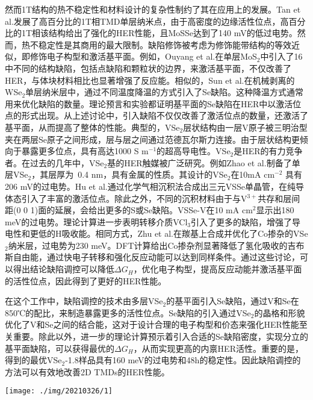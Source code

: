 \documentclass[reprint, aps, prb, showkeys]{revtex4-2}
\begin{document}
然而1T结构的热不稳定性和材料设计的复杂性制约了其在应用上的发展。Tan et al.发展了高百分比的1T相TMD单层纳米点，由于高密度的边缘活性位点，高百分比的1T相该结构给出了强化的HER性能，且MoSSe达到了140 mV的低过电势。然而，热不稳定性是其商用的最大限制。缺陷修饰被考虑为修饰能带结构的等效近似，即修饰电子构型和激活基平面。例如，Ouyang et al.在单层MoS$_2$中引入了16中不同的结构缺陷，包括点缺陷和颗粒状的边界，来激活基平面，不仅改善了HER，与体块材料相比也显著增强了反应能。相似的，Sun et al.在机械剥离的WSe$_2$单层纳米层中，通过不同温度降温的方式引入了Se缺陷。这种降温方式通常用来优化缺陷的数量。理论预言和实验都证明基平面的Se缺陷在HER中以激活位点的形式出现。从上述讨论中，引入缺陷不仅仅改善了激活位点的数量，还激活了基平面，从而提高了整体的性能。典型的，VSe$_2$层状结构由一层V原子被三明治型夹在两层Se原子之间形成，层与层之间通过范德瓦尔斯力连接。由于层状结构更倾向于暴露更多位点，具有高达1000 S m$^{-1}$的超高导电性。VSe$_2$是HER的有力竞争者。在过去的几年中，VSe$_2$基的HER触媒被广泛研究。例如Zhao et al.制备了单层VSe$_2$，其层厚为~0.4 nm，具有金属的性质。其设计的VSe$_2$在10mA cm$^{-2}$ 具有206 mV的过电势。Hu et al.通过化学气相沉积法合成出三元VSSe单晶管，在纯导体态引入了丰富的激活位点。除此之外，不同的沉积材料由于与V$^{3+}$共存和层间距(0 0 1)面的延展，会给出更多的S或Se缺陷。VSSe-V在10 mA cm$^2$显示出180 meV的过电势。理论计算进一步表明转移介质VCl$_3$引入了更多的缺陷，增强了导电性和更低的H吸收能。相同方式，Zhu et al.在羰基上合成并优化了Co掺杂的VSe$_2$纳米层，过电势为230 meV。DFT计算给出Co掺杂剂显著降低了氢化吸收的吉布斯自由能，通过快电子转移和强化反应动能可以达到同样条件。通过这些讨论，可以得出结论缺陷调控可以降低$\Delta G_H$，优化电子构型，提高反应动能并激活基平面的活性位点，因此得到了更好的HER性能。

在这个工作中，缺陷调控的技术由多层VSe$_2$的基平面引入Se缺陷，通过V和Se在850℃的配比，来制造暴露更多的活性位点。Se缺陷的引入通过VSe$_2$的晶格和形貌优化了V和Se之间的结合能，这对于设计合理的电子构型和价态来强化HER性能至关重要。除此以外，进一步的理论计算预示着引入合适的Se缺陷密度，实现分立的基平面缺陷，可以获得最优的$\Delta G_H$，从而实现更高的内禀HER活性。重要的是，得到的最优VSe$_2$-1.8样品具有160 meV的过电势和48h的稳定性。因此缺陷调控的方法可以有效地改善2D TMDs的HER性能。

\begin{figure*}[t]
    \texttt{[image: ./img/20210326/1]}
    \caption{\label{fig:reaction} 
    (a)反应炉；(b)10种温度环境的反应釜；(c)密封VSe$_2$的石英管；(d)VSe$_2$的合成路线；(e)VSe$_2$-1.8的SEM图像；(f)VSe$_2$-1.8的HRTEM图像；(g)VSe$_2$的HER模型；(h)VSe$_2$的暗区图像和对应的(i)V、(j)Se元素。
    }
\end{figure*}
\end{document}
